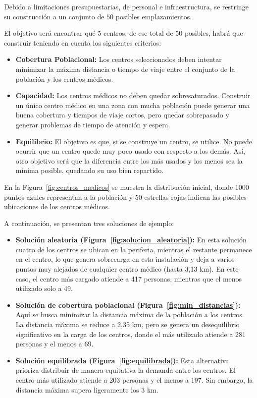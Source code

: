 \documentclass[12pt,a4paper]{book}
\begin{document}
Debido a limitaciones presupuestarias, de personal e infraestructura, se restringe su construcción a un conjunto de $50$ posibles emplazamientos. 

El objetivo será encontrar qué $5$ centros, de ese total de $50$ posibles, habrá que construir teniendo en cuenta los siguientes criterios:

\begin{itemize}
    \item \textbf{Cobertura Poblacional:} Los centros seleccionados deben intentar minimizar la máxima distancia o tiempo de viaje entre el conjunto de la población y los centros médicos.
    \item \textbf{Capacidad:} Los centros médicos no deben quedar sobresaturados. Construir un único centro médico en una zona con mucha población puede generar una buena cobertura y tiempos de viaje cortos, pero quedar sobrepasado y generar problemas de tiempo de atención y espera.
    \item \textbf{Equilibrio:} El objetivo es que, si se construye un centro, se utilice. No puede ocurrir que un centro quede muy poco usado con respecto a los demás. Así, otro objetivo será que la diferencia entre los más usados y los menos sea la mínima posible, quedando su uso bien repartido.
\end{itemize}


En la Figura~\ref{fig:centros_medicos} se muestra la distribución inicial, donde 1000 puntos azules representan a la población y 50 estrellas rojas indican las posibles ubicaciones de los centros médicos.

A continuación, se presentan tres soluciones de ejemplo:

\begin{itemize}
    \item \textbf{Solución aleatoria (Figura~\ref{fig:solucion_aleatoria}):} En esta solución cuatro de los centros se ubican en la periferia, mientras el restante permanece en el centro, lo que genera sobrecarga en esta instalación y deja a varios puntos muy alejados de cualquier centro médico (hasta 3,13 km). En este caso, el centro más cargado atiende a 417 personas, mientras que el menos utilizado solo a 49.
    \item \textbf{Solución de cobertura poblacional (Figura~\ref{fig:min_distancias}):} Aquí se busca minimizar la distancia máxima de la población a los centros. La distancia máxima se reduce a 2,35 km, pero se genera un desequilibrio significativo en la carga de los centros, donde el más utilizado atiende a 281 personas y el menos a 69.
    \item \textbf{Solución equilibrada (Figura~\ref{fig:equilibrada}):} Esta alternativa prioriza distribuir de manera equitativa la demanda entre los centros. El centro más utilizado atiende a 203 personas y el menos a 197. Sin embargo, la distancia máxima supera ligeramente los 3 km.
\end{itemize}
\end{document}
